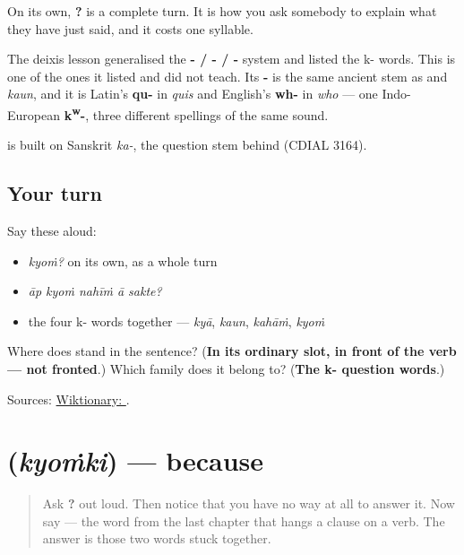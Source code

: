 On its own, \textbf{?} is a complete turn. It is how you ask somebody to explain what they have just said, and it costs one syllable.

The deixis lesson generalised the \textbf{- / - / -} system and listed the k- words. This is one of the ones it listed and did not teach. Its \textbf{-} is the same ancient stem as \textbf{} and \emph{kaun}, and it is Latin's \textbf{qu-} in \emph{quis} and English's \textbf{wh-} in \emph{who} — one Indo-European \textbf{k\textsuperscript{w}-}, three different spellings of the same sound.

\textbf{} is built on Sanskrit \emph{ka-}, the question stem behind \textbf{} (CDIAL 3164).

\subsection*{Your turn}
Say these aloud:

\begin{itemize}
\raggedright
  \item \emph{kyoṁ?} on its own, as a whole turn
  \item \emph{āp kyoṁ nahīṁ ā sakte?}
  \item the four k- words together — \emph{kyā}, \emph{kaun}, \emph{kahāṁ}, \emph{kyoṁ}
\end{itemize}

\begin{tcolorbox}[breakable,colback=teal!4,colframe=teal!35!black,title={Before you move on}]
Where does \textbf{} stand in the sentence? (\textbf{In its ordinary slot, in front of the verb — not fronted}.) Which family does it belong to? (\textbf{The k- question words}.)

Sources: \href{https://en.wiktionary.org/wiki/\%E0\%A4\%95\%E0\%A5\%8D\%E0\%A4\%AF\%E0\%A5\%8B\%E0\%A4\%82}{Wiktionary: }.
\end{tcolorbox}
\section[\texorpdfstring{\hi{क्योंकि} (kyoṁki)}{क्योंकि (kyoṁki)}]{ (\emph{kyoṁki}) — because}

\label{lesson:HI-C71-kyonki}



\begin{quote}
Ask \textbf{?} out loud. Then notice that you have no way at all to answer it. Now say \textbf{} — the word from the last chapter that hangs a clause on a verb. The answer is those two words stuck together.
\end{quote}

